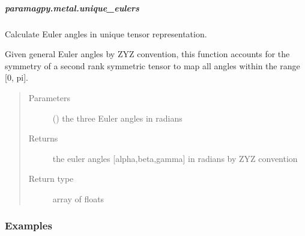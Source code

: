 \documentclass[a4paper,10pt,english,openany,oneside]{sphinxmanual}
\begin{document}
\subparagraph{paramagpy.metal.unique\_eulers}
\label{\detokenize{reference/generated/paramagpy.metal.unique_eulers:paramagpy-metal-unique-eulers}}\label{\detokenize{reference/generated/paramagpy.metal.unique_eulers::doc}}

\begin{fulllineitems}
\label{\detokenize{reference/generated/paramagpy.metal.unique_eulers:paramagpy.metal.unique_eulers}}
Calculate Euler angles in unique tensor representation.

Given general Euler angles by ZYZ convention, this function accounts for
the symmetry of a second rank symmetric tensor to map all angles within
the range {[}0, pi{]}.
\begin{quote}\begin{description}
\item[{Parameters}] \leavevmode
{} () \textendash{} the three Euler angles in radians

\item[{Returns}] \leavevmode
{} \textendash{} the euler angles {[}alpha,beta,gamma{]} in radians
by ZYZ convention

\item[{Return type}] \leavevmode
array of floats

\end{description}\end{quote}
\subsubsection*{Examples}

%
\begin{sphinxVerbatim}[commandchars=\\\{\}]
  \PYG{p}{[}\PYG{p}{]}
\end{sphinxVerbatim}

\end{fulllineitems}
\end{document}
